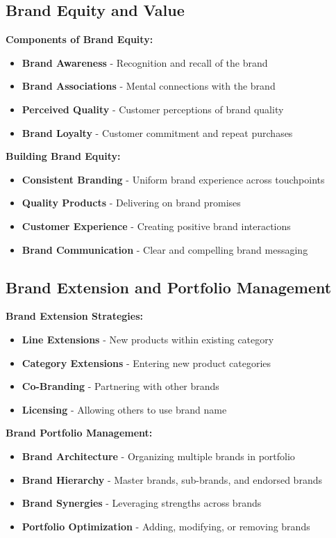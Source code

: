 \documentclass[12pt]{article}
\begin{document}
\subsection{Brand Equity and Value}

\textbf{Components of Brand Equity:}
\begin{itemize}
    \item \textbf{Brand Awareness} - Recognition and recall of the brand
    \item \textbf{Brand Associations} - Mental connections with the brand
    \item \textbf{Perceived Quality} - Customer perceptions of brand quality
    \item \textbf{Brand Loyalty} - Customer commitment and repeat purchases
\end{itemize}

\textbf{Building Brand Equity:}
\begin{itemize}
    \item \textbf{Consistent Branding} - Uniform brand experience across touchpoints
    \item \textbf{Quality Products} - Delivering on brand promises
    \item \textbf{Customer Experience} - Creating positive brand interactions
    \item \textbf{Brand Communication} - Clear and compelling brand messaging
\end{itemize}

\subsection{Brand Extension and Portfolio Management}

\textbf{Brand Extension Strategies:}
\begin{itemize}
    \item \textbf{Line Extensions} - New products within existing category
    \item \textbf{Category Extensions} - Entering new product categories
    \item \textbf{Co-Branding} - Partnering with other brands
    \item \textbf{Licensing} - Allowing others to use brand name
\end{itemize}

\textbf{Brand Portfolio Management:}
\begin{itemize}
    \item \textbf{Brand Architecture} - Organizing multiple brands in portfolio
    \item \textbf{Brand Hierarchy} - Master brands, sub-brands, and endorsed brands
    \item \textbf{Brand Synergies} - Leveraging strengths across brands
    \item \textbf{Portfolio Optimization} - Adding, modifying, or removing brands
\end{itemize}
\end{document}
